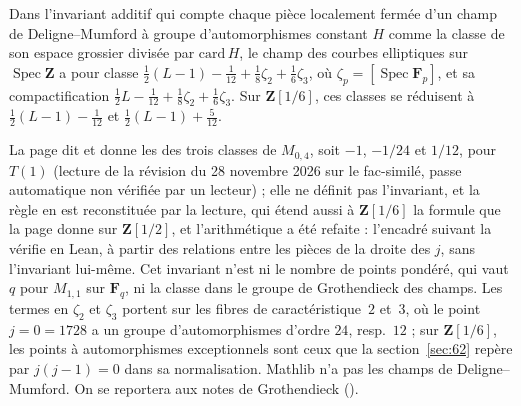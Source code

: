 \begin{encadre}
\begin{exemple*}\nonverifie
Dans l'invariant additif qui compte chaque pièce localement fermée d'un champ de Deligne--Mumford à groupe d'automorphismes constant $H$ comme la classe de son espace grossier divisée par $\mathrm{card}\,H$, le champ des courbes elliptiques sur $\operatorname{Spec}\mathbf Z$ a pour classe $\tfrac12(L-1) - \tfrac1{12} + \tfrac18\zeta_2 + \tfrac16\zeta_3$, où $\zeta_p = [\operatorname{Spec}\mathbf F_p]$, et sa compactification $\tfrac12 L - \tfrac1{12} + \tfrac18\zeta_2 + \tfrac16\zeta_3$. Sur $\mathbf Z[1/6]$, ces classes se réduisent à $\tfrac12(L-1) - \tfrac1{12}$ et $\tfrac12(L-1) + \tfrac5{12}$.
\end{exemple*}
\end{encadre}
{\small La page dit  et donne les  des trois classes de $M_{0,4}$, soit $-1$, $-1/24$ et $1/12$, pour $T(1)$  (lecture de la révision du 28 novembre 2026 sur le fac-similé, passe automatique non vérifiée par un lecteur) ; elle ne définit pas l'invariant, et la règle en est reconstituée par la lecture, qui étend aussi à $\mathbf Z[1/6]$ la formule que la page donne sur $\mathbf Z[1/2]$, et l'arithmétique a été refaite : l'encadré suivant la vérifie en Lean, à partir des relations entre les pièces de la droite des $j$, sans l'invariant lui-même. Cet invariant n'est ni le nombre de points pondéré, qui vaut $q$ pour $M_{1,1}$ sur $\mathbf F_q$, ni la classe dans le groupe de Grothendieck des champs. Les termes en $\zeta_2$ et $\zeta_3$ portent sur les fibres de caractéristique~$2$ et~$3$, où le point $j = 0 = 1728$ a un groupe d'automorphismes d'ordre $24$, resp.~$12$ ; sur $\mathbf Z[1/6]$, les points à automorphismes exceptionnels sont ceux que la section~\ref{sec:62} repère par $j(j-1) = 0$ dans sa normalisation. Mathlib n'a pas les champs de Deligne--Mumford. On se reportera aux notes de Grothendieck ().\par}

